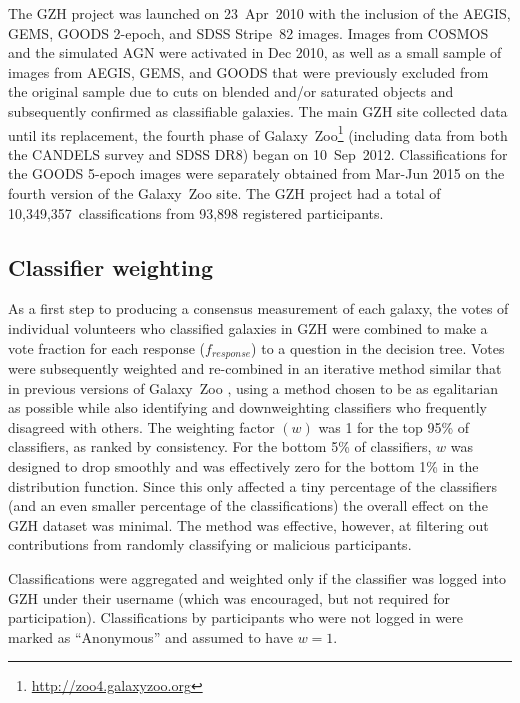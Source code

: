 \documentclass[twocolumn]{aastex6}
\begin{document}
The GZH project was launched on 23~Apr~2010 with the inclusion of the AEGIS,
GEMS, GOODS 2-epoch, and SDSS Stripe~82 images. Images from COSMOS and the
simulated AGN were activated in Dec 2010, as well as a small sample of images
from AEGIS, GEMS, and GOODS that were previously excluded from the original
sample due to cuts on blended and/or saturated objects and subsequently
confirmed as classifiable galaxies. The main GZH site collected data until its
replacement, the fourth phase of
Galaxy~Zoo\footnote{\url{http://zoo4.galaxyzoo.org}} (including data from both
the \hst{} CANDELS survey and SDSS DR8) began on 10~Sep~2012. Classifications
for the GOODS 5-epoch images were separately obtained from Mar-Jun 2015 on the
fourth version of the Galaxy~Zoo site. The GZH project had a total of
10,349,357~classifications from 93,898 registered participants. 


\subsection{Classifier weighting}\label{ssec:weighting}

As a first step to producing a consensus measurement of each galaxy, the votes
of individual volunteers who classified galaxies in GZH were combined to make a
vote fraction for each response ($f_{response}$) to a question in the decision
tree. Votes were subsequently weighted and re-combined in an iterative method
similar that in previous versions of Galaxy~Zoo \citep{lan08,wil13}, using a
method chosen to be as egalitarian as possible while also identifying and
downweighting classifiers who frequently disagreed with others. The weighting
factor $(w)$ was 1 for the top 95\% of classifiers, as ranked by consistency.
For the bottom 5\% of classifiers, $w$ was designed to drop smoothly and was
effectively zero for the bottom 1\% in the distribution function. Since this
only affected a tiny percentage of the classifiers (and an even smaller
percentage of the classifications) the overall effect on the GZH dataset was
minimal. The method was effective, however, at filtering out contributions from
randomly classifying or malicious participants.

Classifications were aggregated and weighted only if the classifier was logged
into GZH under their username (which was encouraged, but not required for
participation). Classifications by participants who were not logged in were marked as
``Anonymous'' and assumed to have $w = 1$. 
\end{document}
